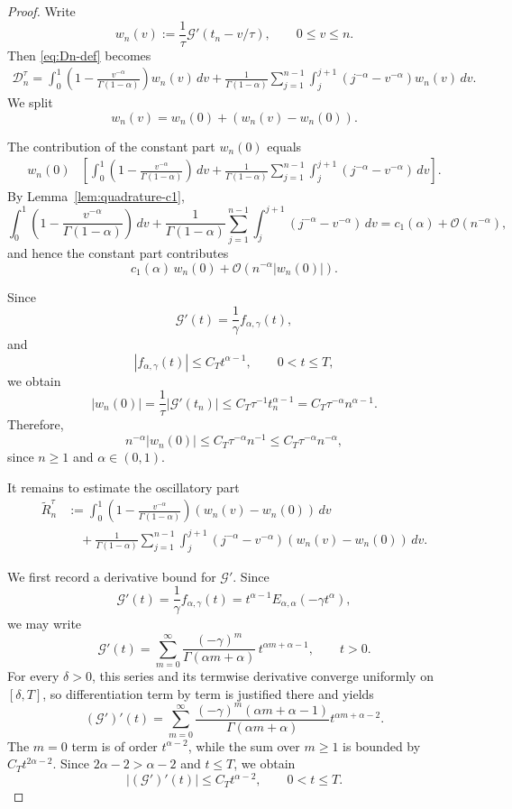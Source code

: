 \documentclass[letterpaper]{article}
\numberwithin{equation}{section}
\theoremstyle{definition}
\theoremstyle{remark}
\begin{document}
\begin{proof}
Write
\[
  w_n(v):=\frac1\tau \mathcal G'(t_n-v/\tau),
  \qquad 0\le v\le n.
\]
Then \eqref{eq:Dn-def} becomes
\begin{align*}
  \mathcal D_n^\tau
  =
  \int_0^1\left(1-\frac{v^{-\alpha}}{\Gamma(1-\alpha)}\right)w_n(v)\,dv
  +
  \frac1{\Gamma(1-\alpha)}
  \sum_{j=1}^{n-1}\int_j^{j+1}(j^{-\alpha}-v^{-\alpha})w_n(v)\,dv.
\end{align*}
We split
\[
  w_n(v)=w_n(0)+\left(w_n(v)-w_n(0)\right).
\]

The contribution of the constant part $w_n(0)$ equals
\begin{align*}
  w_n(0)
  &\left[
    \int_0^1\left(1-\frac{v^{-\alpha}}{\Gamma(1-\alpha)}\right)\,dv
    +
    \frac1{\Gamma(1-\alpha)}
    \sum_{j=1}^{n-1}\int_j^{j+1}(j^{-\alpha}-v^{-\alpha})\,dv
  \right].
\end{align*}
By Lemma~\ref{lem:quadrature-c1},
\[
  \int_0^1\left(1-\frac{v^{-\alpha}}{\Gamma(1-\alpha)}\right)\,dv
  +
  \frac1{\Gamma(1-\alpha)}
  \sum_{j=1}^{n-1}\int_j^{j+1}(j^{-\alpha}-v^{-\alpha})\,dv
  =
  c_1(\alpha)+\mathcal O(n^{-\alpha}),
\]
and hence the constant part contributes
\[
  c_1(\alpha)\,w_n(0)+\mathcal O\!\left(n^{-\alpha}|w_n(0)|\right).
\]

Since
\[
  \mathcal G'(t)=\frac1\gamma f_{\alpha,\gamma}(t),
\]
and
\[
  |f_{\alpha,\gamma}(t)|\le C_T t^{\alpha-1},
  \qquad 0<t\le T,
\]
we obtain
\[
  |w_n(0)|
  =
  \frac1\tau |\mathcal G'(t_n)|
  \le
  C_T\tau^{-1}t_n^{\alpha-1}
  =
  C_T\tau^{-\alpha}n^{\alpha-1}.
\]
Therefore,
\[
  n^{-\alpha}|w_n(0)|
  \le
  C_T\tau^{-\alpha}n^{-1}
  \le
  C_T\tau^{-\alpha}n^{-\alpha},
\]
since $n\ge1$ and $\alpha\in(0,1)$.

It remains to estimate the oscillatory part
\begin{align*}
  \widetilde R_n^\tau
  &:=
  \int_0^1\left(1-\frac{v^{-\alpha}}{\Gamma(1-\alpha)}\right)
  \left(w_n(v)-w_n(0)\right)\,dv
  \\
  &\quad
  +
  \frac1{\Gamma(1-\alpha)}
  \sum_{j=1}^{n-1}\int_j^{j+1}(j^{-\alpha}-v^{-\alpha})
  \left(w_n(v)-w_n(0)\right)\,dv .
\end{align*}

We first record a derivative bound for $\mathcal G'$. Since
\[
  \mathcal G'(t)=\frac1\gamma f_{\alpha,\gamma}(t)
  =t^{\alpha-1}E_{\alpha,\alpha}(-\gamma t^\alpha),
\]
we may write
\[
  \mathcal G'(t)
  =
  \sum_{m=0}^\infty
  \frac{(-\gamma)^m}{\Gamma(\alpha m+\alpha)}\,t^{\alpha m+\alpha-1},
  \qquad t>0.
\]
For every $\delta>0$, this series and its termwise derivative converge uniformly
on $[\delta,T]$, so differentiation term by term is justified there and yields
\[
  (\mathcal G')'(t)
  =
  \sum_{m=0}^\infty
  \frac{(-\gamma)^m(\alpha m+\alpha-1)}{\Gamma(\alpha m+\alpha)}
  t^{\alpha m+\alpha-2}.
\]
The $m=0$ term is of order $t^{\alpha-2}$, while the sum over $m\ge1$ is bounded
by $C_T t^{2\alpha-2}$. Since $2\alpha-2>\alpha-2$ and $t\le T$, we obtain
\[
  |(\mathcal G')'(t)|
  \le C_T t^{\alpha-2},
  \qquad 0<t\le T.
\]


\end{proof}
\end{document}
